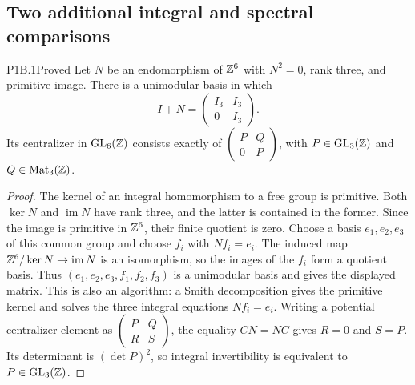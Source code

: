 \subsection{Two additional integral and spectral comparisons}

\begin{statement}{P1B.1}{Proved}
Let $N$ be an endomorphism of $\mathbb Z^6$ with $N^2=0$, rank three,
and primitive image. There is a unimodular basis in which
\[
 I+N=\begin{pmatrix}I_3&I_3\\0&I_3\end{pmatrix}.
\]
Its centralizer in $\operatorname{GL}_6(\mathbb Z)$ consists exactly of
$\left(\begin{smallmatrix}P&Q\\0&P\end{smallmatrix}\right)$,
with $P\in\operatorname{GL}_3(\mathbb Z)$ and $Q\in\operatorname{Mat}_3(\mathbb Z)$.
\end{statement}
\begin{proof}
The kernel of an integral homomorphism to a free group is
primitive. Both $\ker N$ and $\operatorname{im}N$ have rank three,
and the latter is contained in the former. Since the image is
primitive in $\mathbb Z^6$, their finite quotient is zero. Choose a basis
$e_1,e_2,e_3$ of this common group and choose $f_i$ with $Nf_i=e_i$.
The induced map $\mathbb Z^6/\ker N\to\operatorname{im}N$ is an
isomorphism, so the images of the $f_i$ form a quotient basis.
Thus $(e_1,e_2,e_3,f_1,f_2,f_3)$ is a unimodular basis and gives
the displayed matrix. This is also an algorithm: a Smith
decomposition gives the primitive kernel and solves the three
integral equations $Nf_i=e_i$.
Writing a potential centralizer element as
$\left(\begin{smallmatrix}P&Q\\R&S\end{smallmatrix}\right)$,
the equality $CN=NC$ gives $R=0$ and $S=P$.
Its determinant is $(\det P)^2$, so integral invertibility
is equivalent to $P\in\operatorname{GL}_3(\mathbb Z)$.
\end{proof}

